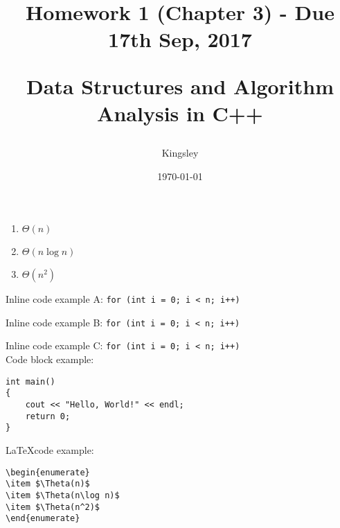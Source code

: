 \documentclass[titlepage]{article}
\title{
Homework 1 (Chapter 3) - Due 17th Sep, 2017\\
\begin{large}
Data Structures and Algorithm Analysis in C++
\end{large}
}
\author{Kingsley}
\date{\today}
\begin{document}
\maketitle

\begin{enumerate}[label=(\alph*)]
\item $\Theta(n)$
\item $\Theta(n\log n)$
\item $\Theta(n^2)$
\end{enumerate}

Inline code example A: \lstinline{for (int i = 0; i < n; i++)}

Inline code example B: \lstinline{for (int i = 0; i < n; i++)}

Inline code example C: \texttt{for (int i = 0; i < n; i++)}\\

Code block example:

\begin{lstlisting}
int main()
{
    cout << "Hello, World!" << endl;
    return 0;
}
\end{lstlisting}

\LaTeX code example:
\begin{verbatim}
\begin{enumerate}
\item $\Theta(n)$
\item $\Theta(n\log n)$
\item $\Theta(n^2)$
\end{enumerate}
\end{verbatim}
\end{document}
